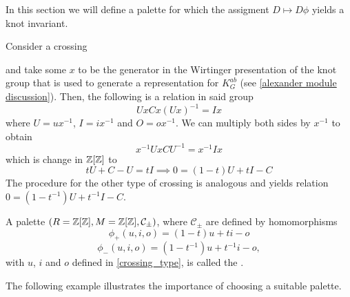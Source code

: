 
In this section we will define a palette for which the assigment $D\mapsto D\phi$ yields a knot invariant.

Consider a crossing
\begin{center}
\end{center}
and take some $x$ to be the generator in the Wirtinger presentation of the knot group that is used to generate a representation for $K_G^{ab}$ (see \cref{alexander module discussion}). Then, the following is a relation in said group
$$UxCx(Ux)^{-1}=Ix$$
where $U=ux^{-1}$, $I=ix^{-1}$ and $O=ox^{-1}$. 
We can multiply both sides by $x^{-1}$ to obtain
$$x^{-1}UxCU^{-1}=x^{-1}Ix$$
which is change in $\operatorname{\mathbb{Z}}[\operatorname{\mathbb{Z}}]$ to
$$
tU+C-U=tI\implies 0=(1-t)U+tI-C
$$
The procedure for the other type of crossing is analogous and yields relation $0=(1-t^{-1})U+t^{-1}I-C$.

\begin{definition}
A palette {\boldmath$(R=\operatorname{\mathbb{Z}}[\operatorname{\mathbb{Z}}], M=\operatorname{\mathbb{Z}}[\operatorname{\mathbb{Z}}], \mathcal{C}_\pm)$}, where $\mathcal{C}_\pm$ are defined by homomorphisms
$$\phi_+(u,i,o)=(1-t)u+ti-o$$
$$\phi_-(u,i,o)=(1-t^{-1})u+t^{-1}i-o,$$
with $u$, $i$ and $o$ defined in \cref{crossing_type}, is called the .
\end{definition}




The following example illustrates the importance of choosing a suitable palette.

